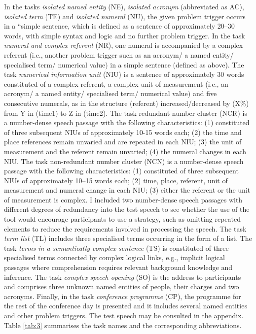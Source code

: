 In the tasks \textit{isolated named entity} (NE), \textit{isolated acronym} (abbreviated as AC), \textit{isolated term} (TE) and \textit{isolated numeral} (NU), the given problem trigger occurs in a “simple sentence, which is defined as a sentence of approximately 20--30 words, with simple syntax and logic and no further problem trigger. In the task \textit{numeral and complex referent} (NR), one numeral is accompanied by a complex referent (i.e., another problem trigger such as an acronym/ a named entity/ specialised term/ numerical value) in a simple sentence (defined as above). The task \textit{numerical information unit} (NIU) is a sentence of approximately 30 words constituted of a complex referent, a complex unit of measurement (i.e., an acronym/ a named entity/ specialised term/ numerical value) and five consecutive numerals, as in the structure (referent) increased/decreased by (X\%) from Y in (time1) to Z in (time2). The task redundant number cluster (NCR) is a number-dense speech passage with the following characteristics: (1) constituted of three subsequent NIUs of approximately 10-15 words each; (2) the time and place references remain unvaried and are repeated in each NIU; (3) the unit of measurement and the referent remain unvaried; (4) the numeral changes in each NIU. The task non-redundant number cluster (NCN) is a number-dense speech passage with the following characteristics: (1) constituted of three subsequent NIUs of approximately 10--15 words each; (2) time, place, referent, unit of measurement and numeral change in each NIU; (3) either the referent or the unit of measurement is complex. I included two number-dense speech passages with different degrees of redundancy into the test speech to see whether the use of the tool would encourage participants to use a strategy, such as omitting repeated elements to reduce the requirements involved in processing the speech. The task \textit{term list} (TL) includes three specialised terms occurring in the form of a list. The task \textit{terms in a semantically complex sentence} (TS) is constituted of three specialised terms connected by complex logical links, e.g., implicit logical passages where comprehension requires relevant background knowledge and inference. The task \textit{complex speech opening} (SO) is the address to participants and comprises three unknown named entities of people, their charges and two acronyms. Finally, in the task \textit{conference programme} (CP), the programme for the rest of the conference day is presented and it includes several named entities and other problem triggers. The test speech may be consulted in the appendix. Table \ref{tab:3} summarises the task names and the corresponding abbreviations.

